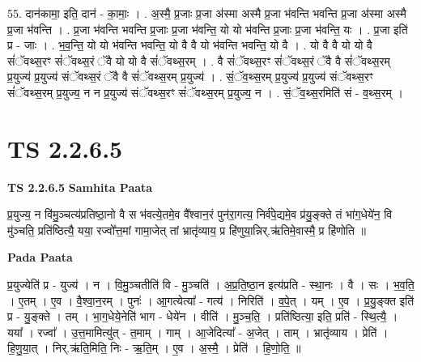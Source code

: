 \documentclass[17pt]{extarticle}
\begin{document}
55. दान॑कामा॒ इति॒ दान॑ - का॒माः॒ । . अ॒स्मै॒ प्र॒जाः प्र॒जा अ॑स्मा अस्मै प्र॒जा भ॑वन्ति भवन्ति प्र॒जा अ॑स्मा अस्मै प्र॒जा भ॑वन्ति । . प्र॒जा भ॑वन्ति भवन्ति प्र॒जाः प्र॒जा भ॑वन्ति॒ यो यो भ॑वन्ति प्र॒जाः प्र॒जा भ॑वन्ति॒ यः । . प्र॒जा इति॑ प्र - जाः । . भ॒व॒न्ति॒ यो यो भ॑वन्ति भवन्ति॒ यो वै वै यो भ॑वन्ति भवन्ति॒ यो वै । . यो वै वै यो यो वै सं॑ॅवथ्स॒रꣳ सं॑ॅवथ्स॒रं ॅवै यो यो वै सं॑ॅवथ्स॒रम् । . वै सं॑ॅवथ्स॒रꣳ सं॑ॅवथ्स॒रं ॅवै वै सं॑ॅवथ्स॒रम् प्र॒युज्य॑ प्र॒युज्य॑ संॅवथ्स॒रं ॅवै वै सं॑ॅवथ्स॒रम् प्र॒युज्य॑ । . सं॒ॅव॒थ्स॒रम् प्र॒युज्य॑ प्र॒युज्य॑ संॅवथ्स॒रꣳ सं॑ॅवथ्स॒रम् प्र॒युज्य॒ न न प्र॒युज्य॑ संॅवथ्स॒रꣳ सं॑ॅवथ्स॒रम् प्र॒युज्य॒ न । . सं॒ॅव॒थ्स॒रमिति॑ सं - व॒थ्स॒रम् । \newline
\pagebreak
{}
\section*{ TS 2.2.6.5 }

\textbf{TS 2.2.6.5 } \newline
\textbf{Samhita Paata} \newline

प्र॒युज्य॒ न वि॑मु॒ञ्चत्य॑प्रतिष्ठा॒नो वै स भ॑वत्ये॒तमे॒व वै᳚श्वान॒रं पुन॑रा॒गत्य॒ निर्व॑पे॒द्यमे॒व प्र॑यु॒ङ्क्ते तं भा॑ग॒धेये॑न॒ वि मु॑ञ्चति॒ प्रति॑ष्ठित्यै॒ यया॒ रज्वो᳚त्त॒मां गामा॒जेत् तां भ्रातृ॑व्याय॒ प्र हि॑णुया॒न्निर्.ऋ॑तिमे॒वास्मै॒ प्र हि॑णोति ॥ \newline

\textbf{Pada Paata} \newline

प्र॒युज्येति॑ प्र - युज्य॑ । न । वि॒मु॒ञ्चतीति॑ वि - मु॒ञ्चति॑ । अ॒प्र॒ति॒ष्ठा॒न इत्य॑प्रति - स्था॒नः । वै । सः । भ॒व॒ति॒ । ए॒तम् । ए॒व । वै॒श्वा॒न॒रम् । पुनः॑ । आ॒गत्येत्या᳚ - गत्य॑ । निरिति॑ । व॒पे॒त् । यम् । ए॒व । प्र॒यु॒ङ्क्त इति॑ प्र - यु॒ङ्क्ते । तम् । भा॒ग॒धेये॒नेति॑ भाग - धेये॑न । वीति॑ । मु॒ञ्च॒ति॒ । प्रति॑ष्ठित्या॒ इति॒ प्रति॑ - स्थि॒त्यै॒ । यया᳚ । रज्वा᳚ । उ॒त्त॒मामित्यु॑त् - त॒माम् । गाम् । आ॒जेदित्या᳚ - अ॒जेत् । ताम् । भ्रातृ॑व्याय । प्रेति॑ । हि॒णु॒या॒त् । निर्.ऋ॑ति॒मिति॒ निः - ऋ॒ति॒म् । ए॒व । अ॒स्मै॒ । प्रेति॑ । हि॒णो॒ति॒ ॥  \newline
\end{document}
